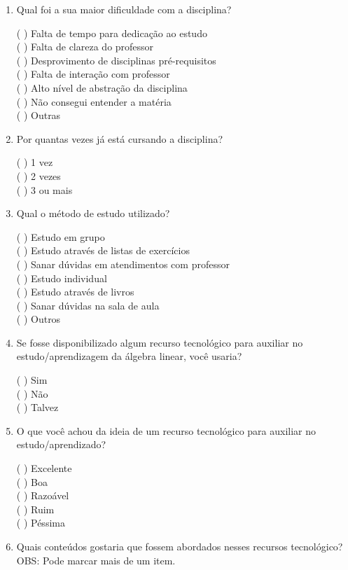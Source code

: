 \begin{enumerate}
    \item Qual foi a sua maior dificuldade com a disciplina? 
    
(   ) Falta de tempo para dedicação ao estudo\\
(   ) Falta de clareza do professor\\
(   ) Desprovimento de disciplinas pré-requisitos \\
(   ) Falta de interação com professor\\
(   ) Alto nível de abstração da disciplina\\
(   ) Não consegui entender a matéria\\
(   ) Outras

    \item Por quantas vezes já está cursando a disciplina?

(   )  1 vez\\
(   )  2 vezes\\
(   )  3 ou mais

    \item Qual o método de estudo utilizado?
    
(   ) Estudo em grupo\\
(   ) Estudo através de listas de exercícios\\
(   ) Sanar dúvidas em atendimentos com professor\\
(   ) Estudo individual\\
(   ) Estudo através de livros\\
(   ) Sanar dúvidas na sala de aula\\
(   ) Outros

\item Se fosse disponibilizado algum recurso tecnológico para auxiliar no estudo/aprendizagem da álgebra linear, você usaria?

(   ) Sim\\
(   ) Não\\
(   ) Talvez

\item O que você achou da ideia de um recurso tecnológico para auxiliar no estudo/aprendizado?

(   ) Excelente\\
(   ) Boa\\
(   ) Razoável\\
(   ) Ruim\\
(   ) Péssima
	
\item Quais conteúdos gostaria que fossem abordados nesses recursos tecnológico? OBS: Pode marcar mais de um item.


\end{enumerate}
